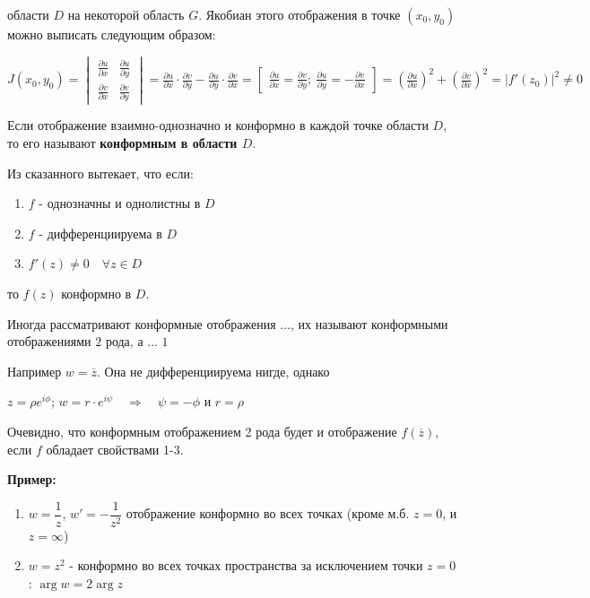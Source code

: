 \documentclass[a4paper, 12pt]{report}
\begin{document}
области $D$ на некоторой область $G$. Якобиан этого отображения в точке $(x_0, y_0)$ можно выписать следующим образом:
\begin{center}
	$J(x_0, y_0) = \begin{vmatrix} \frac{\partial u}{\partial x}& \frac{\partial u}{\partial y} \\ \frac{\partial v}{\partial x}& \frac{\partial v}{\partial y} \end{vmatrix} = \frac{\partial u}{\partial x} \cdot \frac{\partial v}{\partial y} - \frac{\partial u}{\partial y} \cdot \frac{\partial v}{\partial x} = \begin{bmatrix} \frac{\partial u}{\partial x} = \frac{\partial v}{\partial y};\ \frac{\partial u}{\partial y} = -\frac{\partial v}{\partial x} \end{bmatrix} = (\frac{\partial u}{\partial x})^2 + (\frac{\partial v}{\partial x})^2 = |f'(z_0)|^2 \not= 0$
\end{center}

\par\bigskip
Если отображение взаимно-однозначно и конформно в каждой точке области $D$, то его называют \textbf{конформным в области $D$}.
\par\bigskip
Из сказанного вытекает, что если:
\begin{enumerate}
    \item $f$ - однозначны и однолистны в $D$
    \item $f$ - дифференциируема в $D$
    \item $f'(z)\ne 0 \quad \forall z \in D$
\end{enumerate}

то $f(z)$ конформно в $D$.
\par\bigskip

Иногда рассматривают конформные отображения ..., их называют конформными отображениями $2$ рода, а ... $1$
\par\bigskip

Например $w =\overline{z}$. Она не дифференциируема нигде, однако
\begin{center}
    $z=\rho e^{i\phi}$;   \quad   $ w=r\cdot e^{i\psi} \quad \Rightarrow \quad \psi = -\phi $ \quad и \quad $r = \rho$
\end{center}

Очевидно, что конформным отображением 2 рода будет и отображение $f(\overline{z})$, если $f$ обладает свойствами 1-3.
\par\bigskip
\textbf{Пример:}
\begin{enumerate}
    \item $w=\dfrac{1}{z}$, $w'=-\dfrac{1}{z^2}$ отображение конформно во всех точках (кроме м.б. $z=0$, и $z=\infty$)
    \item $w=z^2$ - конформно во всех точках пространства за исключением точки $z=0$ : $\arg w=2\arg z$
\end{enumerate}
\end{document}
